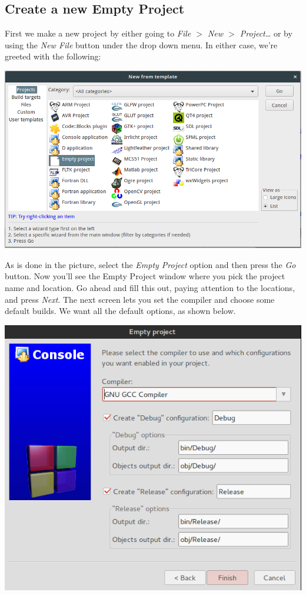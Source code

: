 \documentclass[10pt]{article}
\begin{document}
\subsection{Create a new Empty Project}

First we make a new project by either going to \textit{File $>$ New $>$ Project\ldots} or by using the \textit{New File} button under the drop down menu.  In either case, we're greeted with the following:

\vspace{.1in}
\begin{center}
\includegraphics[scale=.5]{CB_NewProject.png}
\end{center}
\vspace{.1in}

As is done in the picture, select the \textit{Empty Project} option and then press the \textit{Go} button. Now you'll see the Empty Project window where you pick the project name and location. Go ahead and fill this out, paying attention to the locations, and press \textit{Next}. The next screen lets you set the compiler and choose some default builds. We want all the default options, as shown below.


\vspace{.1in}
\begin{center}
\includegraphics[scale=.5]{CB_EmptyProjectBuilds.png}
\end{center}
\vspace{.1in}
\end{document}
